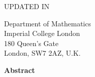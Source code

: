 \begin{titlepage}

    \begin{center}
        \vspace*{4cm}
        
        \Huge
        \reporttitle
        
        \vspace{1cm}
        \LARGE
        \reportauthor
         
        \vspace{0.5cm}
        
        \LARGE
        UPDATED IN \reportupdated
        
        \vspace{1.5cm}
        
        \large
        Department of Mathematics\\
        Imperial College London\\
        180 Queen’s Gate\\
        London, SW7 2AZ, U.K.\\
        
        \vspace{0.5cm}
        
        \texttt{\href{mailto:\reportemail}{\reportemail}}
        
        \vspace{2cm}
        
        \large
        \textbf{Abstract}
        
        \vspace{0.5cm}

        \normalsize
        {\reportabstract}

        \vfill
        
    \end{center}
    
\end{titlepage}

\setcounter{page}{1}